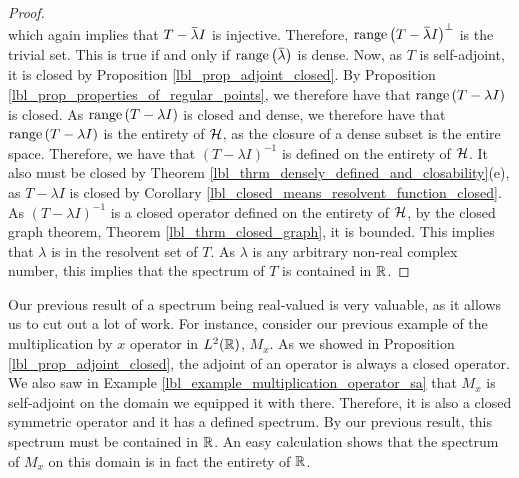 \begin{proof}
\begin{equation*}
  \end{equation*}
  which again implies that $T - \conjugate{\lambda}I$ is injective. Therefore, $\range{T - \conjugate{\lambda} I}^\perp$ is the trivial set. This is true if and only if $\range{\conjugate{\lambda}}$ is dense. Now, as $T$ is self-adjoint, it is closed by Proposition \eqref{lbl_prop_adjoint_closed}. By Proposition \eqref{lbl_prop_properties_of_regular_points}, we therefore have that $\operatorname{range}\left(T - \lambda I\right)$ is closed. As $\operatorname{range}\left(T - \lambda I\right)$ is closed and dense, we therefore have that $\operatorname{range}\left(T - \lambda I\right)$ is the entirety of $\mathcal{H}$, as the closure of a dense subset is the entire space. Therefore, we have that $(T - \lambda I)^{-1}$ is defined on the entirety of $\mathcal{H}$. It also must be closed by Theorem \eqref{lbl_thrm_densely_defined_and_closability}(e), as $T - \lambda I$ is closed by Corollary \eqref{lbl_closed_means_resolvent_function_closed}. As $(T - \lambda I)^{-1}$ is a closed operator defined on the entirety of $\mathcal{H}$, by the closed graph theorem, Theorem \eqref{lbl_thrm_closed_graph}, it is bounded. This implies that $\lambda$ is in the resolvent set of $T$. As $\lambda$ is any arbitrary non-real complex number, this implies that the spectrum of $T$ is contained in $\mathbb{R}$.
\end{proof}

Our previous result of a spectrum being real-valued is very valuable, as it allows us to cut out a lot of work. For instance, consider our previous example of the multiplication by $x$ operator in $L^2(\mathbb{R})$, $M_x$. As we showed in Proposition \eqref{lbl_prop_adjoint_closed}, the adjoint of an operator is always a closed operator. We also saw in Example \eqref{lbl_example_multiplication_operator_sa} that $M_x$ is self-adjoint on the domain we equipped it with there. Therefore, it is also a closed symmetric operator and it has a defined spectrum. By our previous result, this spectrum must be contained in $\mathbb{R}$. An easy calculation shows that the spectrum of $M_x$ on this domain is in fact the entirety of $\mathbb{R}$.


